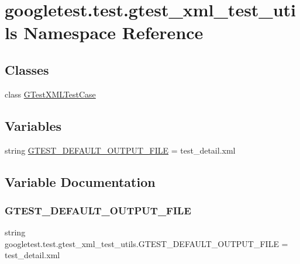 \hypertarget{namespacegoogletest_1_1test_1_1gtest__xml__test__utils}{}\section{googletest.\+test.\+gtest\+\_\+xml\+\_\+test\+\_\+utils Namespace Reference}
\label{namespacegoogletest_1_1test_1_1gtest__xml__test__utils}
\subsection*{Classes}
\begin{DoxyCompactItemize}
\item 
class \mbox{\hyperlink{classgoogletest_1_1test_1_1gtest__xml__test__utils_1_1_g_test_x_m_l_test_case}{G\+Test\+X\+M\+L\+Test\+Case}}
\end{DoxyCompactItemize}
\subsection*{Variables}
\begin{DoxyCompactItemize}
\item 
string \mbox{\hyperlink{namespacegoogletest_1_1test_1_1gtest__xml__test__utils_a5a1d55a3a699ce8c8e20e2abb26af163}{G\+T\+E\+S\+T\+\_\+\+D\+E\+F\+A\+U\+L\+T\+\_\+\+O\+U\+T\+P\+U\+T\+\_\+\+F\+I\+LE}} = \textquotesingle{}test\+\_\+detail.\+xml\textquotesingle{}
\end{DoxyCompactItemize}


\subsection{Variable Documentation}
\mbox{\label{namespacegoogletest_1_1test_1_1gtest__xml__test__utils_a5a1d55a3a699ce8c8e20e2abb26af163}} 
\subsubsection{\texorpdfstring{GTEST\_DEFAULT\_OUTPUT\_FILE}{GTEST\_DEFAULT\_OUTPUT\_FILE}}
{\footnotesize\ttfamily string googletest.\+test.\+gtest\+\_\+xml\+\_\+test\+\_\+utils.\+G\+T\+E\+S\+T\+\_\+\+D\+E\+F\+A\+U\+L\+T\+\_\+\+O\+U\+T\+P\+U\+T\+\_\+\+F\+I\+LE = \textquotesingle{}test\+\_\+detail.\+xml\textquotesingle{}}


